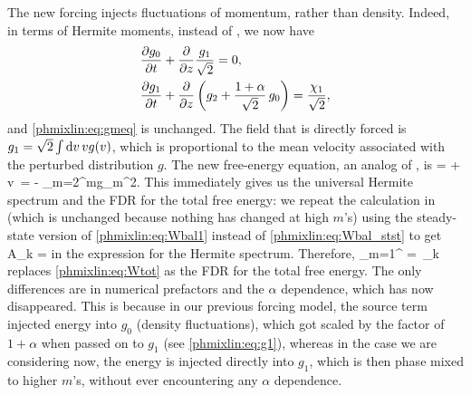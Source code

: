 The new forcing injects fluctuations of momentum, rather than density. 
Indeed, in terms of Hermite moments, instead of , 
we now have 
\begin{align} 
\label{phmixlin:eq:g0mom}
&\frac{\partial g_0}{\partial t} + \frac{\partial }{\partial z}\frac{g_1}{\sqrt{2}}  = 0,\\
\label{phmixlin:eq:g1mom}
&\frac{\partial g_1}{\partial t} + \frac{\partial }{\partial z}\left(g_2 + \frac{1+\alpha}{\sqrt{2}}\,g_0\right)  = \frac{\chi_1}{\sqrt{2}},
\end{align}
and \eqref{phmixlin:eq:gmeq} is unchanged. 
The field that is directly forced is $g_1 = \sqrt{2}\int {\rm d} v\,v g(v)$, which is 
proportional to the mean velocity associated with the perturbed distribution $g$. 
The new free-energy equation, an analog of , is 
\beq
{} =  + \int\rmd v\,
=  - \nu \sum_{m=2}^\infty m\la g_m^2\ra.
\label{phmixlin:eq:Wbal1}
\eeq
This immediately gives us the universal Hermite spectrum and the FDR for the total 
free energy: we repeat the calculation in  (which is unchanged 
because nothing has changed at high $m$'s) using the steady-state 
version of \eqref{phmixlin:eq:Wbal1} instead of \eqref{phmixlin:eq:Wbal_stst} to get 
\beq
A_k =  
\label{phmixlin:eq:Ak1}
\eeq
in the expression  for the Hermite spectrum. 
Therefore,   
\beq
{}\sum_{m=1}^\infty \Cmk 
= \,\eps_k
\label{phmixlin:eq:Wtot1}
\eeq
replaces \eqref{phmixlin:eq:Wtot} as the FDR for the total free energy. 
The only differences are in numerical prefactors and the $\alpha$ dependence, 
which has now disappeared. This is because in our previous 
forcing model, the source term injected
energy into $g_0$ (density fluctuations), which got scaled by the factor of $1+\alpha$ 
when passed on to $g_1$ (see \eqref{phmixlin:eq:g1}), 
whereas in the case we are considering now, the energy is injected directly into $g_1$, 
which is then phase mixed to higher $m$'s, without ever encountering any $\alpha$ dependence.  

